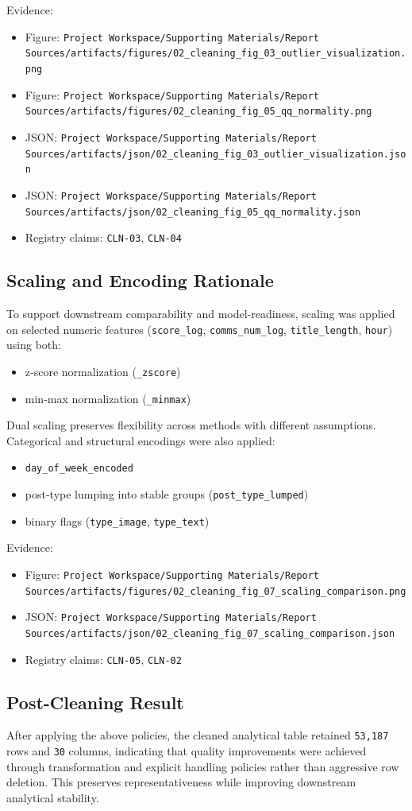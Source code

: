 Evidence:
\begin{itemize}
  \item Figure: \verb|Project Workspace/Supporting Materials/Report Sources/artifacts/figures/02_cleaning_fig_03_outlier_visualization.png|
  \item Figure: \verb|Project Workspace/Supporting Materials/Report Sources/artifacts/figures/02_cleaning_fig_05_qq_normality.png|
  \item JSON: \verb|Project Workspace/Supporting Materials/Report Sources/artifacts/json/02_cleaning_fig_03_outlier_visualization.json|
  \item JSON: \verb|Project Workspace/Supporting Materials/Report Sources/artifacts/json/02_cleaning_fig_05_qq_normality.json|
  \item Registry claims: \texttt{CLN-03}, \texttt{CLN-04}
\end{itemize}

\subsection{Scaling and Encoding Rationale}
To support downstream comparability and model-readiness, scaling was applied on selected numeric features (\texttt{score\_log}, \texttt{comms\_num\_log}, \texttt{title\_length}, \texttt{hour}) using both:
\begin{itemize}
  \item z-score normalization (\texttt{\_zscore})
  \item min-max normalization (\texttt{\_minmax})
\end{itemize}
Dual scaling preserves flexibility across methods with different assumptions. Categorical and structural encodings were also applied:
\begin{itemize}
  \item \texttt{day\_of\_week\_encoded}
  \item post-type lumping into stable groups (\texttt{post\_type\_lumped})
  \item binary flags (\texttt{type\_image}, \texttt{type\_text})
\end{itemize}

Evidence:
\begin{itemize}
  \item Figure: \verb|Project Workspace/Supporting Materials/Report Sources/artifacts/figures/02_cleaning_fig_07_scaling_comparison.png|
  \item JSON: \verb|Project Workspace/Supporting Materials/Report Sources/artifacts/json/02_cleaning_fig_07_scaling_comparison.json|
  \item Registry claims: \texttt{CLN-05}, \texttt{CLN-02}
\end{itemize}

\subsection{Post-Cleaning Result}
After applying the above policies, the cleaned analytical table retained \texttt{53,187} rows and \texttt{30} columns, indicating that quality improvements were achieved through transformation and explicit handling policies rather than aggressive row deletion. This preserves representativeness while improving downstream analytical stability.
